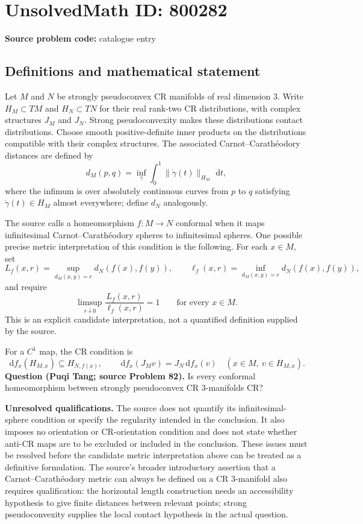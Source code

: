 \documentclass[11pt]{article}
\newcommand{\dd}{\,\mathrm{d}}
\begin{document}
\section*{UnsolvedMath ID: 800282}
\textbf{Source problem code:} catalogue entry
\subsection{Definitions and mathematical statement}
Let \(M\) and \(N\) be strongly pseudoconvex CR manifolds of real dimension \(3\). Write \(H_M\subset TM\) and \(H_N\subset TN\) for their real rank-two CR distributions, with complex structures \(J_M\) and \(J_N\). Strong pseudoconvexity makes these distributions contact distributions. Choose smooth positive-definite inner products on the distributions compatible with their complex structures. The associated Carnot--Carath\'eodory distances are defined by
\[
d_M(p,q)=\inf_{\gamma}\int_0^1\|\dot\gamma(t)\|_{H_M}\,\dd t,
\]
where the infimum is over absolutely continuous curves from \(p\) to \(q\) satisfying \(\dot\gamma(t)\in H_M\) almost everywhere; define \(d_N\) analogously.

The source calls a homeomorphism \(f:M\to N\) conformal when it maps infinitesimal Carnot--Carath\'eodory spheres to infinitesimal spheres. One possible precise metric interpretation of this condition is the following. For each \(x\in M\), set
\[
L_f(x,r)=\sup_{d_M(x,y)=r}d_N(f(x),f(y)),\qquad
\ell_f(x,r)=\inf_{d_M(x,y)=r}d_N(f(x),f(y)),
\]
and require
\[
\limsup_{r\downarrow0}\frac{L_f(x,r)}{\ell_f(x,r)}=1
\qquad\text{for every }x\in M.
\]
This is an explicit candidate interpretation, not a quantified definition supplied by the source.

For a \(C^1\) map, the CR condition is
\[
\dd f_x(H_{M,x})\subseteq H_{N,f(x)},\qquad
\dd f_x(J_Mv)=J_N\dd f_x(v)
\quad(x\in M,\ v\in H_{M,x}).
\]
\textbf{Question (Puqi Tang; source Problem 82).} Is every conformal homeomorphism between strongly pseudoconvex CR \(3\)-manifolds CR?

\textbf{Unresolved qualifications.} The source does not quantify its infinitesimal-sphere condition or specify the regularity intended in the conclusion. It also imposes no orientation or CR-orientation condition and does not state whether anti-CR maps are to be excluded or included in the conclusion. These issues must be resolved before the candidate metric interpretation above can be treated as a definitive formulation. The source's broader introductory assertion that a Carnot--Carath\'eodory metric can always be defined on a CR \(3\)-manifold also requires qualification: the horizontal length construction needs an accessibility hypothesis to give finite distances between relevant points; strong pseudoconvexity supplies the local contact hypothesis in the actual question.
\end{document}
